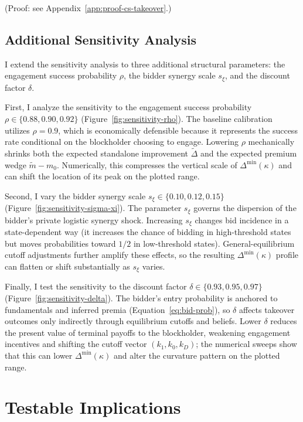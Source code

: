 \documentclass[11pt]{article}
\newcommand{\1}{\mathbf{1}}
\begin{document}
(Proof: see Appendix~\ref{app:proof-cs-takeover}.)

%
\subsection{Additional Sensitivity Analysis}
%

I extend the sensitivity analysis to three additional structural parameters: the engagement success probability $\rho$, the bidder synergy scale $s_\xi$, and the discount factor $\delta$.

First, I analyze the sensitivity to the engagement success probability $\rho \in \{0.88, 0.90, 0.92\}$ (Figure~\ref{fig:sensitivity-rho}). The baseline calibration utilizes $\rho = 0.9$, which is economically defensible because it represents the success rate conditional on the blockholder choosing to engage. Lowering $\rho$ mechanically shrinks both the expected standalone improvement $\tilde{\Delta}$ and the expected premium wedge $\tilde{m}-m_0$. Numerically, this compresses the vertical scale of $\Delta^{\min}(\kappa)$ and can shift the location of its peak on the plotted range.

Second, I vary the bidder synergy scale $s_\xi \in \{0.10, 0.12, 0.15\}$ (Figure~\ref{fig:sensitivity-sigma-xi}). The parameter $s_\xi$ governs the dispersion of the bidder's private logistic synergy shock. Increasing $s_\xi$ changes bid incidence in a state-dependent way (it increases the chance of bidding in high-threshold states but moves probabilities toward $1/2$ in low-threshold states). General-equilibrium cutoff adjustments further amplify these effects, so the resulting $\Delta^{\min}(\kappa)$ profile can flatten or shift substantially as $s_\xi$ varies.

Finally, I test the sensitivity to the discount factor $\delta \in \{0.93, 0.95, 0.97\}$ (Figure~\ref{fig:sensitivity-delta}). The bidder's entry probability is anchored to fundamentals and inferred premia (Equation~\ref{eq:bid-prob}), so $\delta$ affects takeover outcomes only indirectly through equilibrium cutoffs and beliefs. Lower $\delta$ reduces the present value of terminal payoffs to the blockholder, weakening engagement incentives and shifting the cutoff vector $(k_1,k_0,k_D)$; the numerical sweeps show that this can lower $\Delta^{\min}(\kappa)$ and alter the curvature pattern on the plotted range.

\section{Testable Implications}
\label{sec:testable}
\label{sec:testable_implications}
\end{document}

